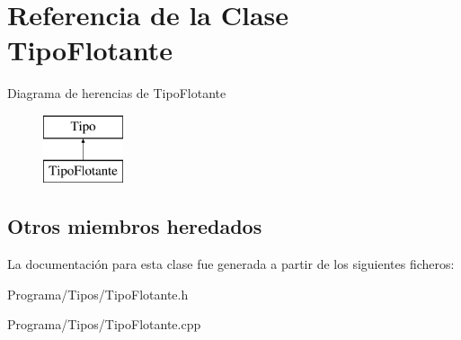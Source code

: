 \hypertarget{class_tipo_flotante}{\section{Referencia de la Clase Tipo\-Flotante}
\label{class_tipo_flotante}
}
Diagrama de herencias de Tipo\-Flotante\begin{figure}[H]
\begin{center}
\leavevmode
\includegraphics[height=2.000000cm]{class_tipo_flotante}
\end{center}
\end{figure}
\subsection*{Otros miembros heredados}


La documentación para esta clase fue generada a partir de los siguientes ficheros\-:\begin{DoxyCompactItemize}
\item 
Programa/\-Tipos/Tipo\-Flotante.\-h\item 
Programa/\-Tipos/Tipo\-Flotante.\-cpp\end{DoxyCompactItemize}

